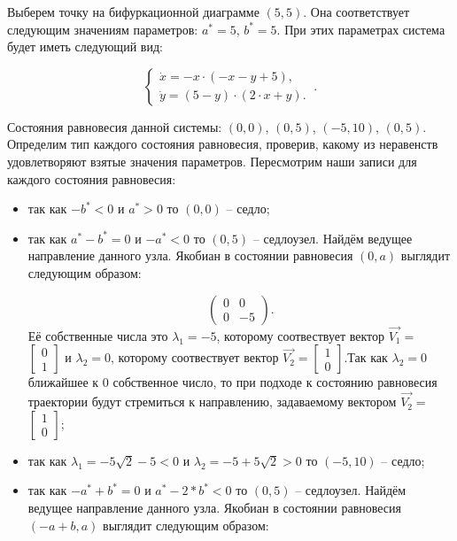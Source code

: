 Выберем точку на бифуркационной диаграмме $(5, 5)$. Она соответствует следующим значениям параметров:  $a^\ast = 5$, $b^\ast = 5$. При этих параметрах система будет иметь следующий вид: 

$$
\left \lbrace 
\begin{matrix} 
	\dot{x} = -x \cdot (-x - y + 5), \\
	\dot{y} = (5 - y) \cdot (2 \cdot x + y). \
\end{matrix} 
\right . .$$

Состояния равновесия данной системы: $(0, 0)$, $(0, 5)$, $(-5, 10)$, $(0, 5)$. Определим тип каждого состояния равновесия, проверив, какому из неравенств удовлетворяют взятые значения параметров.  Пересмотрим наши записи для каждого состояния равновесия: 
\begin{itemize}
	\item{ так как $-b^\ast  < 0 $ и $a^\ast > 0 $ то $(0, 0)$ -- седло;}
	\item{ так как $a^\ast - b^\ast = 0 $ и $-a^\ast  < 0 $ то $(0, 5)$ -- седлоузел. Найдём ведущее направление данного узла. Якобиан в состоянии равновесия $(0, a)$ выглядит следующим образом:
		
		$$\begin{pmatrix}0 & 0\\0 & -5\end{pmatrix}. $$Её собственные числа это $\lambda_1=-5$, которому соотвествует вектор $\Vec{V_1}=$ $\left[\begin{matrix}0\\1\end{matrix}\right]$ и $\lambda_2=0$, которому соотвествует вектор $\Vec{V_2}=$$\left[\begin{matrix}1\\0\end{matrix}\right]$.Так как $\lambda_2=0$ ближайшее к $0$ собственное число, то при подходе к состоянию равновесия траектории будут стремиться к направлению, задаваемому вектором $\Vec{V_2}=$ $\left[\begin{matrix}1\\0\end{matrix}\right]$;}
	\item{ так как ${\lambda_{1}} = - 5 \sqrt{2} - 5$$  < 0 $ и ${\lambda_{2}} = -5 + 5 \sqrt{2}$$ > 0 $ то $(-5, 10)$ -- седло;}
	\item{ так как $-a^\ast + b^\ast = 0 $ и $a^\ast - 2*b^\ast  < 0 $ то $(0, 5)$ -- седлоузел. Найдём ведущее направление данного узла. Якобиан в состоянии равновесия $(-a + b, a)$ выглядит следующим образом:
		
}
\end{itemize}
